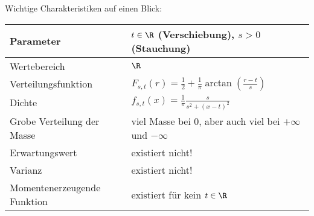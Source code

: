 Wichtige Charakteristiken auf einen Blick:
\begin{center}
\begin{tabular}[h]{|l|l|}
\hline
Parameter& $t\in \R$ (Verschiebung), $s>0$ (Stauchung)\\
\hline
Wertebereich & $\R$\\
\hline
Verteilungsfunktion & $F_{s,t}(r)= \frac{1}{2}+\frac{1}{\pi} \arctan(\frac{r-t}{s})$\\
\hline
Dichte & $f_{s,t} (x)=\frac{1}{\pi}\frac{s}{s^2+(x-t)^2}$\\
\hline
Grobe Verteilung der Masse & viel Masse bei $0$, aber auch viel bei $+\infty$ und $-\infty$\\
\hline
Erwartungswert& existiert nicht! \\
\hline
Varianz & existiert nicht!\\
\hline
Momentenerzeugende Funktion& existiert f\"ur kein $t\in\R$\\
\hline
\end{tabular}
\end{center}





